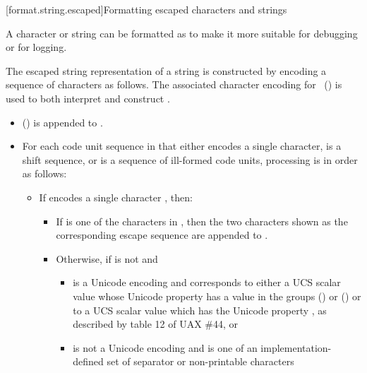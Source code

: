 [format.string.escaped]{Formatting escaped characters and strings}

\pnum
{}%
%
A character or string can be formatted as 
to make it more suitable for debugging or for logging.

\pnum
The escaped string  representation of a string 
is constructed by encoding a sequence of characters as follows.
The associated character encoding 
for ~()
is used to both interpret  and construct .

\begin{itemize}
\item
{} () is appended to .

\item
For each code unit sequence  in  that either
encodes a single character,
is a shift sequence, or
is a sequence of ill-formed code units,
processing is in order as follows:

\begin{itemize}
\item
If  encodes a single character , then:

\begin{itemize}
\item
If  is one of the characters in ,
then the two characters shown as the corresponding escape sequence
are appended to .

\item
Otherwise, if  is not  and

\begin{itemize}
\item
{} is a Unicode encoding and
 corresponds to either
a UCS scalar value whose Unicode property 
has a value in the groups  () or  () or to
a UCS scalar value which has the Unicode property ,
as described by table 12 of UAX \#44, or

\item
{} is not a Unicode encoding and
 is one of an implementation-defined set
of separator or non-printable characters
\end{itemize}


\end{itemize}
\end{itemize}
\end{itemize}
